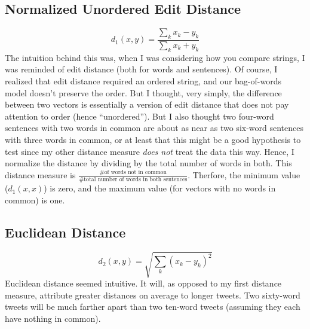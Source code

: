\documentclass[fleqn]{article}
\begin{document}
\subsection{Normalized Unordered Edit Distance}
$$d_{1}(x,y)=\frac{\sum_{k}x_k-y_k}{\sum_{k}x_k+y_k}$$
The intuition behind this was, when I was considering how you compare strings, I was reminded of edit distance (both for words and sentences).  Of course, I realized that edit distance required an ordered string, and our bag-of-words model doesn't preserve the order.  But I thought, very simply, the difference between two vectors is essentially a version of edit distance that does not pay attention to order (hence ``unordered'').  But I also thought two four-word sentences with two words in common are about as near as two six-word sentences with three words in common, or at least that this might be a good hypothesis to test since my other distance measure \textit{does not} treat the data this way.  Hence, I normalize the distance by dividing by the total number of words in both.  This distance measure is $\frac{\text{\# of words not in common}}{\text{\# total number of words in both sentences}}$.  Therfore, the minimum value ($d_{1}(x,x)$) is zero, and the maximum value (for vectors with no words in common) is one.

\subsection{Euclidean Distance}
$$d_{2}(x,y)=\sqrt{\sum_{k}(x_k-y_k)^{2}}$$
Euclidean distance seemed intuitive.  It will, as opposed to my first distance measure, attribute greater distances on average to longer tweets.  Two sixty-word tweets will be much farther apart than two ten-word tweets (assuming they each have nothing in common).
\end{document}
